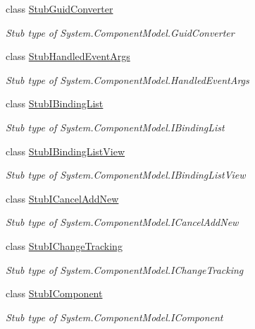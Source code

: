 \begin{DoxyCompactItemize}
class \hyperlink{class_system_1_1_component_model_1_1_fakes_1_1_stub_guid_converter}{Stub\-Guid\-Converter}
\begin{DoxyCompactList}\small\item\em Stub type of System.\-Component\-Model.\-Guid\-Converter\end{DoxyCompactList}\item 
class \hyperlink{class_system_1_1_component_model_1_1_fakes_1_1_stub_handled_event_args}{Stub\-Handled\-Event\-Args}
\begin{DoxyCompactList}\small\item\em Stub type of System.\-Component\-Model.\-Handled\-Event\-Args\end{DoxyCompactList}\item 
class \hyperlink{class_system_1_1_component_model_1_1_fakes_1_1_stub_i_binding_list}{Stub\-I\-Binding\-List}
\begin{DoxyCompactList}\small\item\em Stub type of System.\-Component\-Model.\-I\-Binding\-List\end{DoxyCompactList}\item 
class \hyperlink{class_system_1_1_component_model_1_1_fakes_1_1_stub_i_binding_list_view}{Stub\-I\-Binding\-List\-View}
\begin{DoxyCompactList}\small\item\em Stub type of System.\-Component\-Model.\-I\-Binding\-List\-View\end{DoxyCompactList}\item 
class \hyperlink{class_system_1_1_component_model_1_1_fakes_1_1_stub_i_cancel_add_new}{Stub\-I\-Cancel\-Add\-New}
\begin{DoxyCompactList}\small\item\em Stub type of System.\-Component\-Model.\-I\-Cancel\-Add\-New\end{DoxyCompactList}\item 
class \hyperlink{class_system_1_1_component_model_1_1_fakes_1_1_stub_i_change_tracking}{Stub\-I\-Change\-Tracking}
\begin{DoxyCompactList}\small\item\em Stub type of System.\-Component\-Model.\-I\-Change\-Tracking\end{DoxyCompactList}\item 
class \hyperlink{class_system_1_1_component_model_1_1_fakes_1_1_stub_i_component}{Stub\-I\-Component}
\begin{DoxyCompactList}\small\item\em Stub type of System.\-Component\-Model.\-I\-Component\end{DoxyCompactList}\item 

\end{DoxyCompactItemize}
